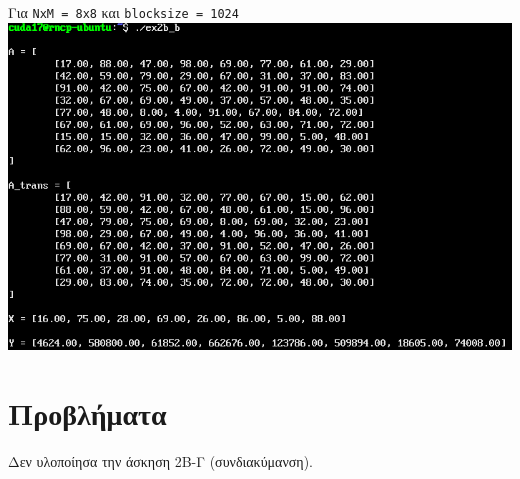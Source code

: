 \documentclass{article}
\begin{document}
Για \lstinline{NxM = 8x8} και \lstinline{blocksize = 1024} \\

\includegraphics[width=\textwidth]{res/ex2b_b_3.png} \\

\section{Προβλήματα}

Δεν υλοποίησα την άσκηση 2B-Γ (συνδιακύμανση).
\end{document}
